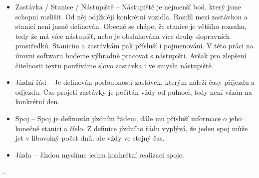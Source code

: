 \begin{itemize}

	\item Zastávka / Stanice / Nástupiště -- Nástupiště je nejmenší bod, který jsme schopni rozlišit. Od něj odjíždějí konkrétní vozidla. Rozdíl mezi zastávkou a stanicí není jasně definován. Obecně se chápe, že stanice je většího rozsahu, tedy že má více nástupišť, nebo je obsluhována více druhy dopravních prostředků. Stanicím a zastávkám pak přísluší i pojmenování. V této práci na úrovni softwaru budeme výhradně pracovat s nástupišti. Avšak pro zlepšení čitelnosti textu používáme slovo zastávka i ve smyslu nástupiště.

	\item Jízdní řád -- Je definován posloupností zastávek, kterým náleží časy příjezdu a odjezdu. Čas projetí zastávky je počítán vždy od půlnoci, tedy není vázán na konkrétní den.

	\item Spoj -- Spoj je definován jízdním řádem, dále mu přísluší informace o jeho konečné stanici a číslo. Z definice jízdního řádu vyplývá, že jeden spoj může jet v libovolný počet dnů, ale vždy ve stejný čas.

	\item Jízda -- Jízdou myslíme jednu konkrétní realizaci spoje.

\end{itemize}.
